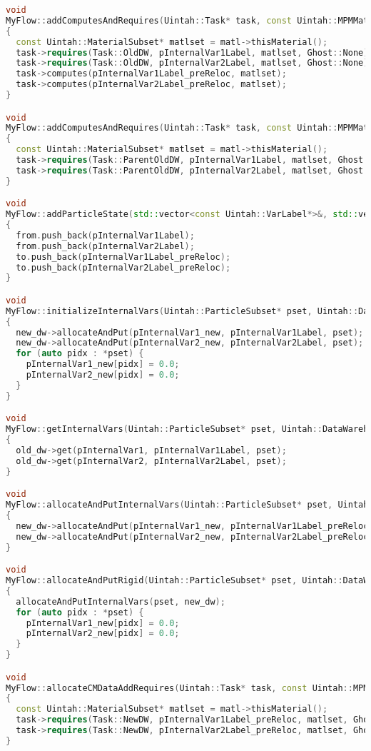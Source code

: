 \begin{enumerate}
\begin{lstlisting}[language=Cpp]
void
MyFlow::addComputesAndRequires(Uintah::Task* task, const Uintah::MPMMaterial* matl, const Uintah::PatchSet*)
{
  const Uintah::MaterialSubset* matlset = matl->thisMaterial();
  task->requires(Task::OldDW, pInternalVar1Label, matlset, Ghost::None);
  task->requires(Task::OldDW, pInternalVar2Label, matlset, Ghost::None);
  task->computes(pInternalVar1Label_preReloc, matlset);
  task->computes(pInternalVar2Label_preReloc, matlset);
}

void
MyFlow::addComputesAndRequires(Uintah::Task* task, const Uintah::MPMMaterial*, const Uintah::PatchSet*, bool, bool)
{
  const Uintah::MaterialSubset* matlset = matl->thisMaterial();
  task->requires(Task::ParentOldDW, pInternalVar1Label, matlset, Ghost::None);
  task->requires(Task::ParentOldDW, pInternalVar2Label, matlset, Ghost::None);
}

void
MyFlow::addParticleState(std::vector<const Uintah::VarLabel*>&, std::vector<const Uintah::VarLabel*>&)
{
  from.push_back(pInternalVar1Label);
  from.push_back(pInternalVar2Label);
  to.push_back(pInternalVar1Label_preReloc);
  to.push_back(pInternalVar2Label_preReloc);
}

void
MyFlow::initializeInternalVars(Uintah::ParticleSubset* pset, Uintah::DataWarehouse* new_dw)
{
  new_dw->allocateAndPut(pInternalVar1_new, pInternalVar1Label, pset);
  new_dw->allocateAndPut(pInternalVar2_new, pInternalVar2Label, pset);
  for (auto pidx : *pset) {
    pInternalVar1_new[pidx] = 0.0;
    pInternalVar2_new[pidx] = 0.0;
  }
}

void
MyFlow::getInternalVars(Uintah::ParticleSubset* pset, Uintah::DataWarehouse* old_dw)
{
  old_dw->get(pInternalVar1, pInternalVar1Label, pset);
  old_dw->get(pInternalVar2, pInternalVar2Label, pset);
}

void
MyFlow::allocateAndPutInternalVars(Uintah::ParticleSubset* pset, Uintah::DataWarehouse* new_dw)
{
  new_dw->allocateAndPut(pInternalVar1_new, pInternalVar1Label_preReloc, pset);
  new_dw->allocateAndPut(pInternalVar2_new, pInternalVar2Label_preReloc, pset);
}

void
MyFlow::allocateAndPutRigid(Uintah::ParticleSubset* pset, Uintah::DataWarehouse* new_dw)
{
  allocateAndPutInternalVars(pset, new_dw);
  for (auto pidx : *pset) {
    pInternalVar1_new[pidx] = 0.0;
    pInternalVar2_new[pidx] = 0.0;
  }
}

void
MyFlow::allocateCMDataAddRequires(Uintah::Task* task, const Uintah::MPMMaterial* matl, const Uintah::PatchSet*, Uintah::MPMLabel*)
{
  const Uintah::MaterialSubset* matlset = matl->thisMaterial();
  task->requires(Task::NewDW, pInternalVar1Label_preReloc, matlset, Ghost::None);
  task->requires(Task::NewDW, pInternalVar2Label_preReloc, matlset, Ghost::None);
}


\end{lstlisting}
\end{enumerate}

